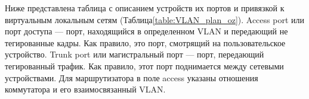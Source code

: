 
Ниже представлена таблица с описанием устройств их портов и  привязкой к виртуальным локальным сетям (Таблица\;\ref{table:VLAN_plan_oz}). Access port или порт доступа — порт, находящийся в определенном VLAN и передающий не тегированные кадры. Как правило, это порт, смотрящий на пользовательское устройство. Trunk port или магистральный порт — порт, передающий тегированный трафик. Как правило, этот порт поднимается между сетевыми устройствами. Для маршрутизатора в поле access указаны отношения коммутатора и его взаимосвязанный VLAN.

